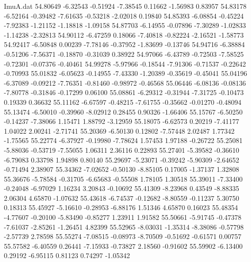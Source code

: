 \begin{filecontents}{ImuA.dat}
  54.80649   -6.32543   -0.51924   -7.38545    0.11662   -1.56983    0.83957
  54.83178   -6.52164   -0.39482   -7.61635   -0.53218   -2.02018    0.19840
  54.85393   -6.08854   -0.45224   -7.92383   -1.21152   -1.18818   -1.09158
  54.87703   -6.14955   -0.07896   -7.30289   -1.02833   -1.14238   -2.32813
  54.90112   -6.47259    0.18066   -7.40818   -0.82224   -2.16521   -1.58773
  54.92417   -6.50848    0.00239   -7.78146   -0.37952   -1.83699   -0.13746
  54.94716   -6.38884   -0.51206   -7.56371   -0.18870   -0.31039    0.38922
  54.97066   -6.43789   -0.72503   -7.58525   -0.72301   -0.07376   -0.40461
  54.99278   -5.97966   -0.18544   -7.91306   -0.71537   -0.22642   -0.70993
  55.01832   -6.05623   -0.14955   -7.43330   -1.20389   -0.35619   -0.45041
  55.04196   -6.37089   -0.09212   -7.76351   -0.81460   -0.98972   -0.46568
  55.06446   -6.08136   -0.08136   -7.80778   -0.31846   -0.17299    0.06100
  55.08861   -6.29312   -0.31944   -7.31725   -0.10473    0.19339    0.36632
  55.11162   -6.67597   -0.48215   -7.61755   -0.35662   -0.01270   -0.48094
  55.13474   -6.50010   -0.39960   -8.02912    0.28455    0.90326   -1.66406
  55.15767   -6.50250   -0.14237   -7.38066    1.15471    1.88792   -3.12959
  55.18075   -6.62573    0.20219   -7.41177    1.04022    2.00241   -2.71741
  55.20369   -6.50130    0.12802   -7.57448    2.02487    1.77342   -1.75565
  55.22774   -6.37927   -0.19980   -7.78624    1.57453    1.97188   -0.26722
  55.25081   -5.88036   -0.53719   -7.55055    1.06311    2.36116    0.22893
  55.27401   -5.39582   -0.36610   -6.79083    0.33798    1.94898    0.80140
  55.29697   -5.23071   -0.39242   -5.90309   -2.64652   -0.71494    2.38907
  55.34362   -7.02652   -0.50130   -8.85105    0.17005   -1.37137    1.32808
  55.36676   -5.78584   -0.31705   -6.65683   -0.55508    1.78105    1.30518
  55.39011   -7.33400   -0.24048   -6.97029    1.16234    3.20843   -0.10692
  55.41309   -8.23968    0.43549   -8.88335    2.06304    4.65870   -1.07632
  55.43618   -6.74537   -0.12682   -8.80559   -0.11237    5.30750    0.18313
  55.45927   -5.16610   -0.28953   -6.88176    1.51346    4.65870    0.16023
  55.48354   -4.77607   -0.20100   -5.83490   -0.85277    1.23911    1.91582
  55.50661   -5.91745   -0.47378   -7.61037   -2.85261   -1.26451    4.82399
  55.52965   -8.03031   -1.35314   -8.38086   -0.57798   -2.57739    2.78598
  55.55274   -7.08515   -0.08973   -8.70509   -0.51692   -0.61571    0.00757
  55.57582   -6.40559    0.26441   -7.15933   -0.73827    2.18560   -0.91602
  55.59902   -6.13400    0.29192   -6.95115    0.81123    0.74297   -1.05342

\end{filecontents}
